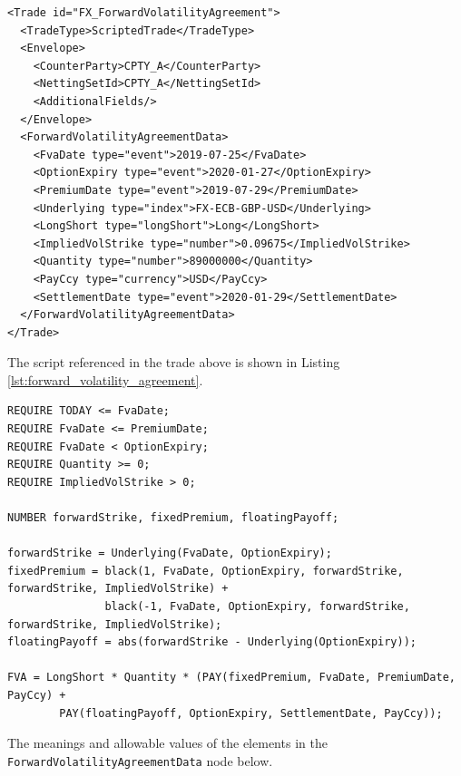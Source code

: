 \begin{verbatim}
<Trade id="FX_ForwardVolatilityAgreement">
  <TradeType>ScriptedTrade</TradeType>
  <Envelope>
    <CounterParty>CPTY_A</CounterParty>
    <NettingSetId>CPTY_A</NettingSetId>
    <AdditionalFields/>
  </Envelope>
  <ForwardVolatilityAgreementData>
    <FvaDate type="event">2019-07-25</FvaDate>
    <OptionExpiry type="event">2020-01-27</OptionExpiry>
    <PremiumDate type="event">2019-07-29</PremiumDate>
    <Underlying type="index">FX-ECB-GBP-USD</Underlying>
    <LongShort type="longShort">Long</LongShort>
    <ImpliedVolStrike type="number">0.09675</ImpliedVolStrike>
    <Quantity type="number">89000000</Quantity>
    <PayCcy type="currency">USD</PayCcy>
    <SettlementDate type="event">2020-01-29</SettlementDate>
  </ForwardVolatilityAgreementData>
</Trade>
\end{verbatim}

The script referenced in the trade above is shown in Listing \ref{lst:forward_volatility_agreement}.

\begin{listing}[hbt]
\begin{verbatim}
REQUIRE TODAY <= FvaDate;
REQUIRE FvaDate <= PremiumDate;
REQUIRE FvaDate < OptionExpiry;
REQUIRE Quantity >= 0;
REQUIRE ImpliedVolStrike > 0;

NUMBER forwardStrike, fixedPremium, floatingPayoff;

forwardStrike = Underlying(FvaDate, OptionExpiry);
fixedPremium = black(1, FvaDate, OptionExpiry, forwardStrike, forwardStrike, ImpliedVolStrike) +
               black(-1, FvaDate, OptionExpiry, forwardStrike, forwardStrike, ImpliedVolStrike);
floatingPayoff = abs(forwardStrike - Underlying(OptionExpiry));

FVA = LongShort * Quantity * (PAY(fixedPremium, FvaDate, PremiumDate, PayCcy) +
        PAY(floatingPayoff, OptionExpiry, SettlementDate, PayCcy));
\end{verbatim}
\caption{Payoff script for a Forward Volatility Agreement.}
\label{lst:forward_volatility_agreement}
\end{listing}

The meanings and allowable values of the elements in the \lstinline!ForwardVolatilityAgreementData! node below.

